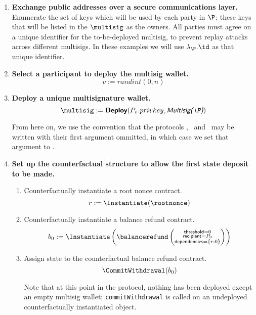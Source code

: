 \documentclass[prb,floatfix,reprint,nofootinbib,amsmath,amssymb,epsfig,pre,floats,letterpaper,groupedaffiliation,tightenlines,allcolors=blue,11pt]{revtex4}
\theoremstyle{definition}
\theoremstyle{definition}
\theoremstyle{definition}
\begin{document}
\begin{enumerate}

\item \textbf{Exchange public addresses over a secure communications layer.}
Enumerate the set of keys which will be used by each party in $\P$; these keys that will be listed in the $\multisig$ as the owners. All parties must agree on a unique identifier for the to-be-deployed multisig, to prevent replay attacks across different multisigs. In these examples we will use $\lambda_\P.\id$ as that unique identifier.

\item \textbf{Select a participant to deploy the multisig wallet.}
\[
v := randint(0, n)
\]

\item \textbf{Deploy a unique multisignature wallet.}
\[
\multisig := \textbf{\textsf{Deploy}}(P_v.privkey, \textit{\textsf{Multisig($\P$)}})
\]

From here on, we use the convention that the protocols \Instantiate, \CommitWithdrawal\ and \Update\ may be written with their first argument ommitted, in which case we set that argument to \multisig.

\item \textbf{Set up the counterfactual structure to allow the first state deposit to be made.}

\begin{enumerate}

\item Counterfactually instantiate a root nonce contract.
\[
    r := \Instantiate(\rootnonce)
\]

\item Counterfactually instantiate a balance refund contract.
\[
b_0 := \Instantiate\left(
\balancerefund\left(\substack{
    \textsf{threshold}=0 \\
    \textsf{recipient}=P_0 \\
    \textsf{dependencies}=\left\{r:0\right\}
    }\right)
    \right)
\]

\item Assign state to the counterfactual balance refund contract.
\[
\CommitWithdrawal(b_0)
\]

Note that at this point in the protocol, nothing has been deployed except an empty multisig wallet; \texttt{commitWithdrawal} is called on an undeployed counterfactually instantiated object.

\end{enumerate}


\end{enumerate}
\end{document}
